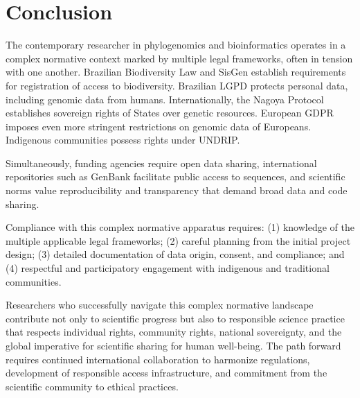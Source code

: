 \section{Conclusion}

The contemporary researcher in phylogenomics and bioinformatics operates in a complex normative context marked by multiple legal frameworks, often in tension with one another. Brazilian Biodiversity Law and SisGen establish requirements for registration of access to biodiversity. Brazilian LGPD protects personal data, including genomic data from humans. Internationally, the Nagoya Protocol establishes sovereign rights of States over genetic resources. European GDPR imposes even more stringent restrictions on genomic data of Europeans. Indigenous communities possess rights under UNDRIP.

Simultaneously, funding agencies require open data sharing, international repositories such as GenBank facilitate public access to sequences, and scientific norms value reproducibility and transparency that demand broad data and code sharing.

Compliance with this complex normative apparatus requires: (1) knowledge of the multiple applicable legal frameworks; (2) careful planning from the initial project design; (3) detailed documentation of data origin, consent, and compliance; and (4) respectful and participatory engagement with indigenous and traditional communities.

Researchers who successfully navigate this complex normative landscape contribute not only to scientific progress but also to responsible science practice that respects individual rights, community rights, national sovereignty, and the global imperative for scientific sharing for human well-being. The path forward requires continued international collaboration to harmonize regulations, development of responsible access infrastructure, and commitment from the scientific community to ethical practices.

